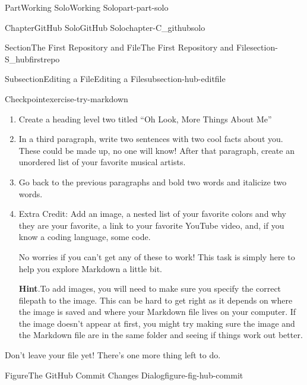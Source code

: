 \documentclass[twoside,10pt,]{book}
\newcommand{\blocktitlefont}{\relax}
\begin{document}
\begin{partptx}{Part}{Working Solo}{}{Working Solo}{}{}{part-part-solo}
\begin{chapterptx}{Chapter}{GitHub Solo}{}{GitHub Solo}{}{}{chapter-C_githubsolo}
\begin{sectionptx}{Section}{The First Repository and File}{}{The First Repository and File}{}{}{section-S_hubfirstrepo}
\begin{subsectionptx}{Subsection}{Editing a File}{}{Editing a File}{}{}{subsection-hub-editfile}
\begin{inlineexercise}{Checkpoint}{}{exercise-try-markdown}
\begin{enumerate}[font=\bfseries,label=(\alph*),ref=\alph*]
\item{}Create a heading level two titled ``Oh Look, More Things About Me''%
\item{}In a third paragraph, write two sentences with two cool facts about you. These could be made up, no one will know! After that paragraph, create an unordered list of your favorite musical artists.%
\item{}Go back to the previous paragraphs and bold two words and italicize two words.%
\item{}Extra Credit: Add an image, a nested list of your favorite colors and why they are your favorite, a link to your favorite YouTube video, and, if you know a coding language, some code.%
\par
No worries if you can't get any of these to work! This task is simply here to help you explore Markdown a little bit.%
\par\smallskip%
\noindent\textbf{\blocktitlefont Hint}.\label{hint-try-markdown-i-b}{}\hypertarget{hint-try-markdown-i-b}{}\quad{}To add images, you will need to make sure you specify the correct filepath to the image. This can be hard to get right as it depends on where the image is saved and where your Markdown file lives on your computer. If the image doesn't appear at first, you might try making sure the image and the Markdown file are in the same folder and seeing if things work out better.%
\end{enumerate}%
Don't leave your file yet! There's one more thing left to do.%
\end{inlineexercise}%
%
\begin{figureptx}{Figure}{The GitHub Commit Changes Dialog}{figure-fig-hub-commit}{}%
\begin{image}{0.15}{0.7}{0.15}{}%

\end{image}
\end{figureptx}
\end{subsectionptx}
\end{sectionptx}
\end{chapterptx}
\end{partptx}
\end{document}

